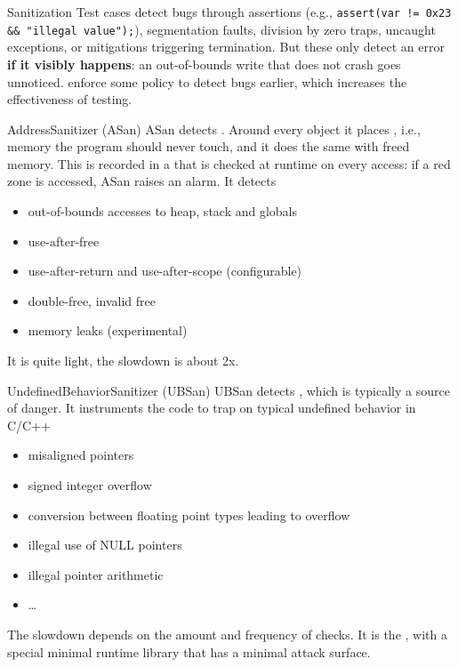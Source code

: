\begin{parag}{Sanitization}
    Test cases detect bugs through assertions (e.g., \texttt{assert(var != 0x23 \&\& "illegal value");}), segmentation faults, division by zero traps, uncaught exceptions, or mitigations triggering termination. But these only detect an error \textbf{if it visibly happens}: an out-of-bounds write that does not crash goes unnoticed.  enforce some policy to detect bugs earlier, which increases the effectiveness of testing.
    \begin{subparag}{AddressSanitizer (ASan)}
        ASan detects . Around every object it places , i.e., memory the program should never touch, and it does the same with freed memory. This is recorded in a  that is checked at runtime on every access: if a red zone is accessed, ASan raises an alarm. It detects
        \begin{itemize}
            \item out-of-bounds accesses to heap, stack and globals
            \item use-after-free
            \item use-after-return and use-after-scope (configurable)
            \item double-free, invalid free
            \item memory leaks (experimental)
        \end{itemize}
        It is quite light, the slowdown is about 2x.
    \end{subparag}
    \begin{subparag}{UndefinedBehaviorSanitizer (UBSan)}
        UBSan detects , which is typically a source of danger. It instruments the code to trap on typical undefined behavior in C/C++
        \begin{itemize}
            \item misaligned pointers
            \item signed integer overflow
            \item conversion between floating point types leading to overflow
            \item illegal use of NULL pointers
            \item illegal pointer arithmetic
            \item \dots
        \end{itemize}
        The slowdown depends on the amount and frequency of checks. It is the , with a special minimal runtime library that has a minimal attack surface.
    \end{subparag}
\end{parag}

